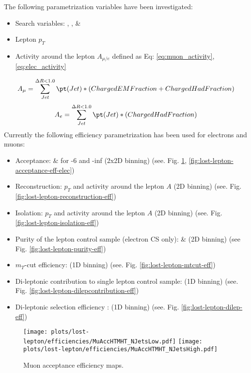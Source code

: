 The following parametrization variables have been investigated: 
\begin{itemize}
\item Search variables: \HT, \MHT, \NJets \& \BTags
\item Lepton $p_T$
\item Activity around the lepton $A_{\mu/e}$  defined as Eq: \ref{eq:muon_activity},\ref{eq:elec_activity}
\end{itemize}
\begin{equation}
  A_{\mu} = \sum_{Jet}^{\Delta R<1.0} \pt(Jet) * (ChargedEMFraction + ChargedHadFraction) 
  \label{eq:muon_activity}
\end{equation}
\begin{equation}
  A_{e} = \sum_{Jet}^{\Delta R<1.0} \pt(Jet) * (ChargedHadFraction) 
  \label{eq:elec_activity}
\end{equation}
Currently the following efficiency parametrization has been used for electrons and muons:
\begin{itemize}
\item Acceptance: \HT \& \MHT for -6 and -inf (2x2D binning) (see. Fig. \ref{fig:lost-lepton-acceptance-eff-mu}, \ref{fig:lost-lepton-acceptance-eff-elec})
\item Reconstruction: $p_{T}$ and activity around the lepton $A$ (2D binning) (see. Fig. \ref{fig:lost-lepton-reconstruction-eff})
\item Isolation: $p_{T}$ and activity around the lepton $A$ (2D binning) (see. Fig. \ref{fig:lost-lepton-isolation-eff})
\item Purity of the lepton control sample (electron CS only): \MHT \& \NJets (2D binning) (see Fig. \ref{fig:lost-lepton-purity-eff})
\item $m_T$-cut efficiency: \NJets (1D binning) (see. Fig. \ref{fig:lost-lepton-mtcut-eff})
\item Di-leptonic contribution to single lepton control sample: \NJets (1D binning) (see. Fig. \ref{fig:lost-lepton-dilepcontribution-eff})
\item Di-leptonic selection efficiency : \NJets (1D binning) (see. Fig. \ref{fig:lost-lepton-dilep-eff})
\end{itemize}

\begin{figure}[h]
  \centering
  \texttt{[image: plots/lost-lepton/efficiencies/MuAccHTMHT\_NJetsLow.pdf]}
  \texttt{[image: plots/lost-lepton/efficiencies/MuAccHTMHT\_NJetsHigh.pdf]}
  \caption{Muon acceptance efficiency maps.}
  \label{fig:lost-lepton-acceptance-eff-mu}
\end{figure}

